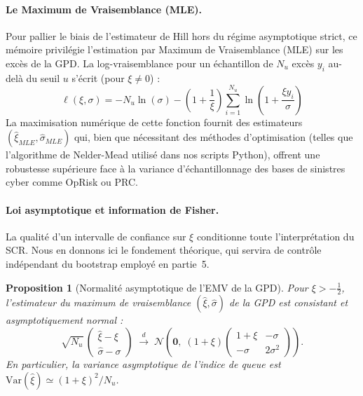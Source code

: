 \documentclass[11pt,a4paper]{article}
\theoremstyle{navystyle}
\newtheorem{proposition}[theorem]{Proposition}
\theoremstyle{navydef}
\newcommand{\Var}{\mathrm{Var}}
\begin{document}
\paragraph{Le Maximum de Vraisemblance (MLE).}
Pour pallier le biais de l'estimateur de Hill hors du régime asymptotique strict, ce mémoire privilégie l'estimation par Maximum de Vraisemblance (MLE) sur les excès de la GPD. La log-vraisemblance pour un échantillon de $N_u$ excès $y_i$ au-delà du seuil $u$ s'écrit (pour $\xi \neq 0$) :
\begin{equation}
\ell(\xi, \sigma) = -N_u \ln(\sigma) - \left(1 + \frac{1}{\xi}\right) \sum_{i=1}^{N_u} \ln\left(1 + \frac{\xi y_i}{\sigma}\right)
\label{eq:loglik-gpd}
\end{equation}
La maximisation numérique de cette fonction fournit des estimateurs $(\hat{\xi}_{MLE}, \hat{\sigma}_{MLE})$ qui, bien que nécessitant des méthodes d'optimisation (telles que l'algorithme de Nelder-Mead utilisé dans nos scripts Python), offrent une robustesse supérieure face à la variance d'échantillonnage des bases de sinistres cyber comme OpRisk ou PRC.

\paragraph{Loi asymptotique et information de Fisher.} La qualité d'un intervalle de confiance sur $\xi$ conditionne toute l'interprétation du SCR. Nous en donnons ici le fondement théorique, qui servira de contrôle indépendant du bootstrap employé en partie~5.

\begin{proposition}[Normalité asymptotique de l'EMV de la GPD]\label{prop:fisher}
Pour $\xi > -\tfrac{1}{2}$, l'estimateur du maximum de vraisemblance $(\hat\xi,\hat\sigma)$ de la GPD est consistant et asymptotiquement normal :
\begin{equation}
\sqrt{N_u}\,\begin{pmatrix}\hat\xi-\xi\\[2pt]\hat\sigma-\sigma\end{pmatrix}
\;\xrightarrow{\;d\;}\;
\mathcal{N}\!\left(\mathbf{0},\; (1+\xi)\begin{pmatrix}1+\xi & -\sigma\\[2pt] -\sigma & 2\sigma^2\end{pmatrix}\right).
\end{equation}
En particulier, la variance asymptotique de l'indice de queue est
$\Var(\hat\xi)\simeq (1+\xi)^2/N_u$.
\end{proposition}
\end{document}
